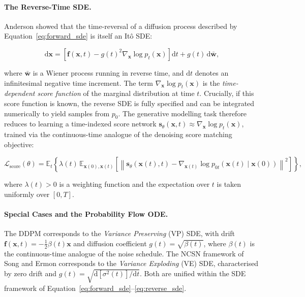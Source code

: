 \paragraph{The Reverse-Time SDE.}
Anderson \cite{anderson1982reverse} showed that the time-reversal of a
diffusion process described by Equation~\ref{eq:forward_sde} is itself
an Itô SDE:

\begin{equation}
    \mathrm{d}\mathbf{x} = \left[
    \mathbf{f}(\mathbf{x}, t) -
    g(t)^2 \nabla_{\mathbf{x}} \log p_t(\mathbf{x})
    \right]\mathrm{d}t
    + g(t)\,\mathrm{d}\bar{\mathbf{w}},
    \label{eq:reverse_sde}
\end{equation}

\noindent where $\bar{\mathbf{w}}$ is a Wiener process running in reverse
time, and $\mathrm{d}t$ denotes an infinitesimal negative time increment.
The term $\nabla_{\mathbf{x}} \log p_t(\mathbf{x})$ is the \emph{time-dependent
score function} of the marginal distribution at time $t$. Crucially, if this
score function is known, the reverse SDE is fully specified and can be
integrated numerically to yield samples from $p_0$. The generative modelling
task therefore reduces to learning a time-indexed score network
$\mathbf{s}_\theta(\mathbf{x}, t) \approx \nabla_{\mathbf{x}} \log p_t(\mathbf{x})$,
trained via the continuous-time analogue of the denoising score matching
objective:

\begin{equation}
    \mathcal{L}_{\text{score}}(\theta) =
    \mathbb{E}_{t}\!\left\{
    \lambda(t)\,\mathbb{E}_{\mathbf{x}(0), \mathbf{x}(t)}\!\left[
    \left\|\mathbf{s}_\theta(\mathbf{x}(t), t) -
    \nabla_{\mathbf{x}(t)} \log p_{0t}(\mathbf{x}(t) \mid \mathbf{x}(0))
    \right\|^2\right]\right\},
    \label{eq:score_sde_loss}
\end{equation}

\noindent where $\lambda(t) > 0$ is a weighting function and the expectation
over $t$ is taken uniformly over $[0, T]$.

\paragraph{Special Cases and the Probability Flow ODE.}
The DDPM corresponds to the \emph{Variance Preserving} (VP) SDE, with drift
$\mathbf{f}(\mathbf{x}, t) = -\frac{1}{2}\beta(t)\mathbf{x}$ and diffusion
coefficient $g(t) = \sqrt{\beta(t)}$, where $\beta(t)$ is the continuous-time
analogue of the noise schedule. The NCSN framework of Song and Ermon corresponds
to the \emph{Variance Exploding} (VE) SDE, characterised by zero drift and
$g(t) = \sqrt{\mathrm{d}[\sigma^2(t)]/\mathrm{d}t}$. Both are unified within
the SDE framework of Equation~\ref{eq:forward_sde}--\ref{eq:reverse_sde}.

